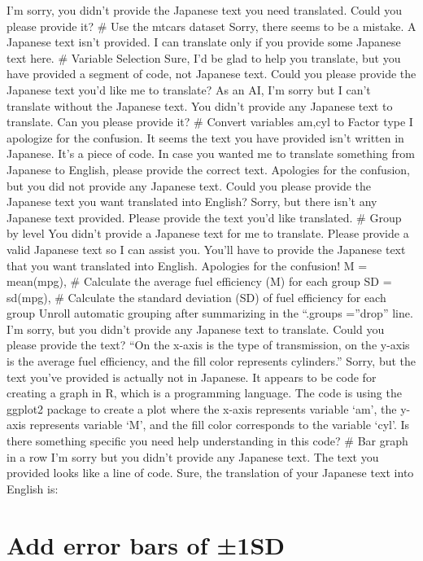 \documentclass[
  a4paper,
]{book}
\begin{document}
I'm sorry, you didn't provide the Japanese text you need translated.
Could you please provide it? \# Use the mtcars dataset Sorry, there
seems to be a mistake. A Japanese text isn't provided. I can translate
only if you provide some Japanese text here. \# Variable Selection Sure,
I'd be glad to help you translate, but you have provided a segment of
code, not Japanese text. Could you please provide the Japanese text
you'd like me to translate? As an AI, I'm sorry but I can't translate
without the Japanese text. You didn't provide any Japanese text to
translate. Can you please provide it? \# Convert variables am,cyl to
Factor type I apologize for the confusion. It seems the text you have
provided isn't written in Japanese. It's a piece of code. In case you
wanted me to translate something from Japanese to English, please
provide the correct text. Apologies for the confusion, but you did not
provide any Japanese text. Could you please provide the Japanese text
you want translated into English? Sorry, but there isn't any Japanese
text provided. Please provide the text you'd like translated. \# Group
by level You didn't provide a Japanese text for me to translate. Please
provide a valid Japanese text so I can assist you. You'll have to
provide the Japanese text that you want translated into English.
Apologies for the confusion! M = mean(mpg), \# Calculate the average
fuel efficiency (M) for each group SD = sd(mpg), \# Calculate the
standard deviation (SD) of fuel efficiency for each group Unroll
automatic grouping after summarizing in the ``.groups =''drop'' line.
I'm sorry, but you didn't provide any Japanese text to translate. Could
you please provide the text? ``On the x-axis is the type of
transmission, on the y-axis is the average fuel efficiency, and the fill
color represents cylinders.'' Sorry, but the text you've provided is
actually not in Japanese. It appears to be code for creating a graph in
R, which is a programming language. The code is using the ggplot2
package to create a plot where the x-axis represents variable `am', the
y-axis represents variable `M', and the fill color corresponds to the
variable `cyl'. Is there something specific you need help understanding
in this code? \# Bar graph in a row I'm sorry but you didn't provide any
Japanese text. The text you provided looks like a line of code. Sure,
the translation of your Japanese text into English is:


\chapter{Add error bars of ±1SD}\label{add-error-bars-of-1sd}
\end{document}
